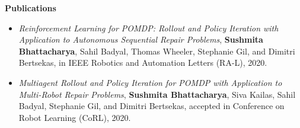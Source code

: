 \documentclass[a4paper,11pt]{article}
\newcommand{\resheading}[1]{{\small \colorbox{mygrey}{\begin{minipage}{0.975\textwidth}{\textbf{#1 \vphantom{p\^{E}}}}\end{minipage}}}}
\begin{document}
	\resheading{\textbf{\large Publications}}
	\begin{description}
		\item %
		\begin{itemize}
			\item \textit{Reinforcement Learning for POMDP: Rollout and Policy Iteration with Application to Autonomous Sequential Repair Problems}, \textbf{Sushmita Bhattacharya}, Sahil Badyal, Thomas Wheeler, Stephanie Gil, and Dimitri Bertsekas, in IEEE Robotics and Automation Letters (RA-L), 2020. %
		\end{itemize}
		\item 
		\begin{itemize}
			\item \textit{Multiagent Rollout and Policy Iteration for POMDP with Application to Multi-Robot Repair Problems}, \textbf{Sushmita Bhattacharya}, Siva Kailas, Sahil Badyal, Stephanie Gil, and Dimitri Bertsekas, accepted in Conference on Robot Learning (CoRL), 2020. 
		\end{itemize}
	\end{description}
	
	
	\iffalse
	\resheading{\textbf{\large References}}
	\begin{description}
		\item \hspace{0.75 cm}\textbf{Dr. Stephanie Gil}\\School of Engineering and Applied Sciences (CS)\\Harvard University\\Email: sgil@seas.harvard.edu
		\item \hspace{0.75 cm}\textbf{Dr. Dimitri P. Bertsekas}\\McAfee Professor of Engineering\\Massachusetts Institute of Technology,\\Fulton Professor of Computational Decision Making\\Arizona State University\\Email: dimitrib@mit.edu
	\end{description}
	\fi
	
	
\end{document}
